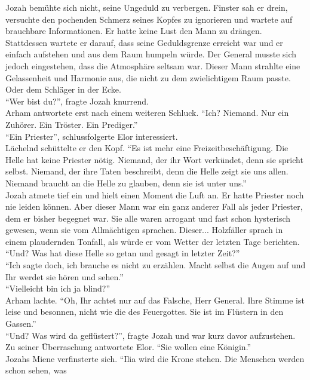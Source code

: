 Jozah bemühte sich nicht, seine Ungeduld zu verbergen. Finster sah er drein, versuchte den 
pochenden Schmerz seines Kopfes zu ignorieren und wartete auf brauchbare Informationen. Er hatte 
keine Lust den Mann zu drängen. Stattdessen wartete er darauf, dass seine Geduldsgrenze erreicht 
war und er einfach aufstehen und aus dem Raum humpeln würde. Der General musste sich jedoch 
eingestehen, dass die Atmosphäre seltsam war. Dieser Mann strahlte eine Gelassenheit und Harmonie 
aus, die nicht zu dem zwielichtigem Raum passte. Oder dem Schläger in der Ecke.\\
``Wer bist du?'', fragte Jozah knurrend.\\
Arham antwortete erst nach einem weiteren Schluck. ``Ich? Niemand. Nur ein Zuhörer. Ein Tröster. 
Ein Prediger.''\\
``Ein Priester'', schlussfolgerte Elor interessiert.\\
Lächelnd schüttelte er den Kopf. ``Es ist mehr eine Freizeitbeschäftigung. Die Helle hat keine 
Priester nötig. Niemand, der ihr Wort verkündet, denn sie spricht selbst. Niemand, der ihre Taten 
beschreibt, denn die Helle zeigt sie uns allen. Niemand braucht an die Helle zu glauben, denn sie 
ist unter uns.''\\
Jozah atmete tief ein und hielt einen Moment die Luft an. Er hatte Priester noch nie leiden können. 
Aber dieser Mann war ein ganz anderer Fall als jeder Priester, dem er bisher begegnet war. Sie alle 
waren arrogant und fast schon hysterisch gewesen, wenn sie vom Allmächtigen sprachen. Dieser... 
Holzfäller sprach in einem plaudernden Tonfall, als würde er vom Wetter der letzten Tage 
berichten.\\
``Und? Was hat diese Helle so getan und gesagt in letzter Zeit?''\\
``Ich sagte doch, ich brauche es nicht zu erzählen. Macht selbst die Augen auf und Ihr werdet sie 
hören und sehen.''\\
``Vielleicht bin ich ja blind?''\\
Arham lachte. ``Oh, Ihr achtet nur auf das Falsche, Herr General. Ihre Stimme ist leise und 
besonnen, nicht wie die des Feuergottes. Sie ist im Flüstern in den Gassen.''\\
``Und? Was wird da geflüstert?'', fragte Jozah und war kurz davor aufzustehen.\\
Zu seiner Überraschung antwortete Elor. ``Sie wollen eine Königin.''\\
Jozahs Miene verfinsterte sich. ``Ilia wird die Krone stehen. Die Menschen werden schon sehen, was 
